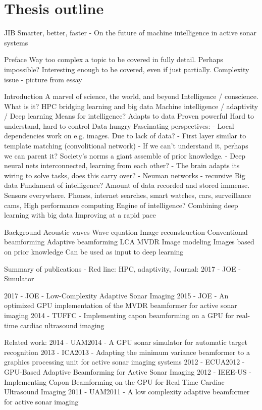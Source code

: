 \section{Thesis outline}

JIB
Smarter, better, faster - On the future of machine intelligence in active sonar systems 

Preface
  Way too complex a topic to be covered in fully detail. Perhaps impossible?
  Interesting enough to be covered, even if just partially.
  Complexity issue - picture from essay
  
Introduction
   A marvel of science, the world, and beyond
      Intelligence / conscience. What is it?
      HPC bridging learning and big data
   Machine intelligence / adaptivity / Deep learning
      Means for intelligence?
      Adapts to data
      Proven powerful
      Hard to understand, hard to control
      Data hungry
      Fascinating perspectives:
      - Local dependencies work on e.g. images. Due to lack of data?
      - First layer similar to template matching (convolitional network)
      - If we can't understand it, perhaps we can parent it? Society's norms a giant assemble of prior knowledge.
      - Deep neural nets interconnected, learning from each other?
      - The brain adapts its wiring to solve tasks, does this carry over?
      - Neuman networks - recursive
   Big data
      Fundament of intelligence?
      Amount of data recorded and stored immense. Sensors everywhere.
      Phones, internet searches, smart watches, cars, surveillance cams,   
   High performance computing
      Engine of intelligence?
      Combining deep learning with big data
      Improving at a rapid pace
      
      
Background
   Acoustic waves
      Wave equation
   Image reconstruction
      Conventional beamforming
      Adaptive beamforming
         LCA
         MVDR
   Image modeling
      Images based on prior knowledge
      Can be used as input to deep learning
      

Summary of publications
   - Red line: HPC, adaptivity,
   Journal:
      2017 - JOE - Simulator
               
      2017 - JOE - Low-Complexity Adaptive Sonar Imaging
      2015 - JOE - An optimized GPU implementation of the MVDR beamformer for active sonar imaging
      2014 - TUFFC - Implementing capon beamforming on a GPU for real-time cardiac ultrasound imaging 
      
   Related work:
      2014 - UAM2014 - A GPU sonar simulator for automatic target recognition
      2013 - ICA2013 - Adapting the minimum variance beamformer to a graphics processing unit for active sonar imaging systems
      2012 - ECUA2012 - GPU-Based Adaptive Beamforming for Active Sonar Imaging
      2012 - IEEE-US - Implementing Capon Beamforming on the GPU for Real Time Cardiac Ultrasound Imaging
      2011 - UAM2011 - A low complexity adaptive beamformer for active sonar imaging


